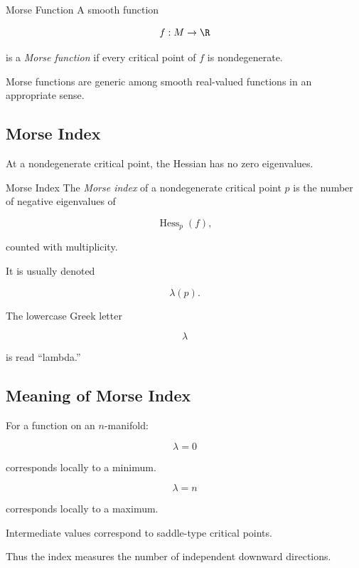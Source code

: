 \begin{definitionbox}{Morse Function}
A smooth function

\[
f:M\to\R
\]

is a \emph{Morse function} if every critical point of \(f\) is
nondegenerate.
\end{definitionbox}

Morse functions are generic among smooth real-valued functions in an
appropriate sense.

\subsection{Morse Index}
\label{subsec:morse-index}

At a nondegenerate critical point, the Hessian has no zero eigenvalues.

\begin{definitionbox}{Morse Index}
The \emph{Morse index} of a nondegenerate critical point \(p\) is the number
of negative eigenvalues of

\[
\operatorname{Hess}_p(f),
\]

counted with multiplicity.
\end{definitionbox}

It is usually denoted

\[
\boxed{
\lambda(p).
}
\]

The lowercase Greek letter

\[
\lambda
\]

is read ``lambda.''

\subsection{Meaning of Morse Index}
\label{subsec:meaning-morse-index}

For a function on an \(n\)-manifold:

\[
\lambda=0
\]

corresponds locally to a minimum.

\[
\lambda=n
\]

corresponds locally to a maximum.

Intermediate values correspond to saddle-type critical points.

Thus the index measures the number of independent downward directions.

